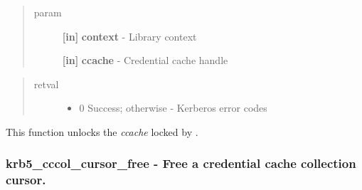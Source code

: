 \documentclass[letterpaper,10pt,english]{sphinxmanual}
\begin{document}
\begin{quote}\begin{description}
\item[{param}] \leavevmode
\textbf{{[}in{]}} \textbf{context} - Library context

\textbf{{[}in{]}} \textbf{ccache} - Credential cache handle

\end{description}\end{quote}
\begin{quote}\begin{description}
\item[{retval}] \leavevmode\begin{itemize}
\item {} 
0   Success; otherwise - Kerberos error codes

\end{itemize}

\end{description}\end{quote}

This function unlocks the \emph{ccache} locked by {\hyperref[appdev/refs/api/krb5_cc_lock:krb5_cc_lock]{}} .


\subsubsection{krb5\_cccol\_cursor\_free -  Free a credential cache collection cursor.}
\label{appdev/refs/api/krb5_cccol_cursor_free::doc}\label{appdev/refs/api/krb5_cccol_cursor_free:krb5-cccol-cursor-free-free-a-credential-cache-collection-cursor}

\begin{fulllineitems}
\label{appdev/refs/api/krb5_cccol_cursor_free:krb5_cccol_cursor_free}
\end{fulllineitems}
\end{document}
